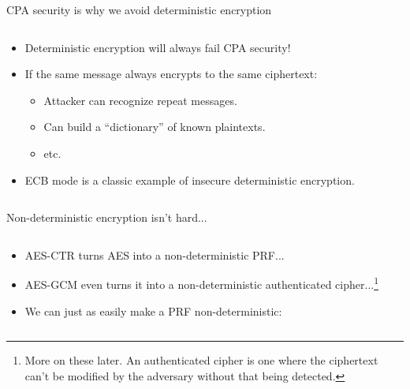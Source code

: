 \documentclass[aspectratio=169, lualatex, handout]{beamer}
\begin{document}
\begin{frame}{CPA security is why we avoid deterministic encryption}
	\begin{columns}[c]
		\begin{column}{0.5\textwidth}
			\begin{itemize}[<+->]
				\item Deterministic encryption will always fail CPA security!
				\item If the same message always encrypts to the same ciphertext:
				      \begin{itemize}
					      \item Attacker can recognize repeat messages.
					      \item Can build a ``dictionary'' of known plaintexts.
					      \item etc.
				      \end{itemize}
				\item ECB mode is a classic example of insecure deterministic encryption.
			\end{itemize}
		\end{column}
		\begin{column}{0.5\textwidth}
			\begin{center}
			\end{center}
		\end{column}
	\end{columns}
\end{frame}

\begin{frame}{Non-deterministic encryption isn't hard...}
	\begin{columns}[c]
		\begin{column}{0.5\textwidth}
			\begin{itemize}[<+->]
				\item AES-CTR turns AES into a non-deterministic PRF...
				\item AES-GCM even turns it into a non-deterministic authenticated cipher...\footnote{More on these later. An authenticated cipher is one where the ciphertext can't be modified by the adversary without that being detected.}
				\item We can just as easily make a PRF non-deterministic:
			\end{itemize}
		\end{column}
		\begin{column}{0.5\textwidth}
		\end{column}
	\end{columns}
\end{frame}
\end{document}
